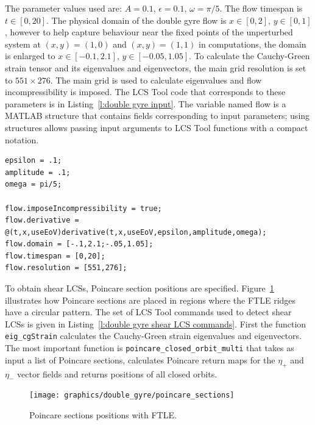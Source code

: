 \documentclass{article}
\begin{document}
The parameter values used are: $A = 0.1$, $\epsilon = 0.1$, $\omega = \pi/5$. The flow timespan is $t \in [0,20]$. The physical domain of the double gyre flow is $x \in [0,2]$, $y \in [0,1]$, however to help capture behaviour near the fixed points of the unperturbed system at $(x,y) = (1,0)$ and $(x,y) = (1,1)$ in computations, the domain is enlarged to $x \in [-0.1,2.1]$, $y \in [-0.05,1.05]$. To calculate the Cauchy-Green strain tensor and its eigenvalues and eigenvectors, the main grid resolution is set to $551 \times 276$. The main grid is used to calculate eigenvalues and flow incompressibility is imposed. The LCS Tool code that corresponds to these parameters is in Listing~\ref{l:double gyre input}. The variable named flow is a MATLAB structure that contains fields corresponding to input parameters; using structures allows passing input arguments to LCS Tool functions with a compact notation.

\begin{lstlisting}[firstnumber=4,caption={Double gyre input parameter definitions; subset of the file: \texttt{demo/double\_gyre/hyperbolic\_shear\_lcs.m}.},label=l:double gyre input]
epsilon = .1;
amplitude = .1;
omega = pi/5;

flow.imposeIncompressibility = true;
flow.derivative = @(t,x,useEoV)derivative(t,x,useEoV,epsilon,amplitude,omega);
flow.domain = [-.1,2.1;-.05,1.05];
flow.timespan = [0,20];
flow.resolution = [551,276];
\end{lstlisting}

To obtain shear LCSs, Poincare section positions are specified. Figure~\ref{f:Poincare sections with FTLE} illustrates how Poincare sections are placed in regions where the FTLE ridges have a circular pattern. The set of LCS Tool commands used to detect shear LCSs is given in Listing~\ref{l:double gyre shear LCS commands}. First the function \texttt{eig\_cgStrain} calculates the Cauchy-Green strain eigenvalues and eigenvectors. The most important function is \texttt{poincare\_closed\_orbit\_multi} that takes as input a list of Poincare sections, calculates Poincare return maps for the $\eta_+$ and $\eta_-$ vector fields and returns positions of all closed orbits.

\begin{figure}
\begin{center}
\texttt{[image: graphics/double\_gyre/poincare\_sections]}
\end{center}
\caption{Poincare sections positions with FTLE.}
\label{f:Poincare sections with FTLE}
\end{figure}
\end{document}
